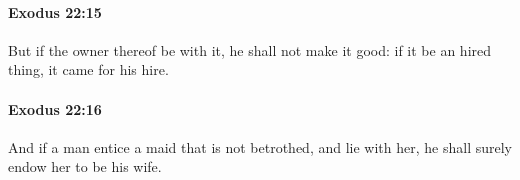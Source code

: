 		\paragraph{Exodus 22:15} %
			\label{EXODUS-22-15}

			But if the owner thereof be with it, he shall not make it good: if it be an hired thing, it came for his hire.


		\paragraph{Exodus 22:16} %
			\label{EXODUS-22-16}

			And if a man entice a maid that is not betrothed, and lie with her, he shall surely endow her to be his wife.


